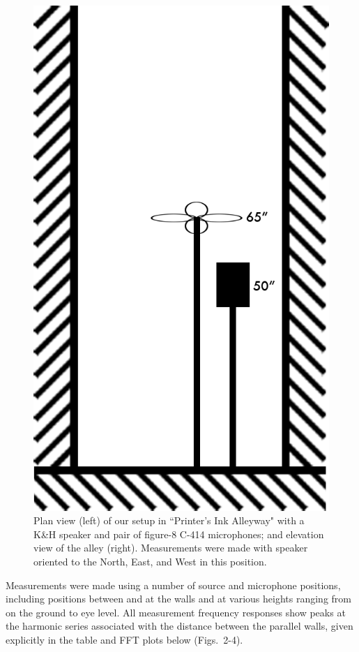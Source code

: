 \documentclass{aes137}
\begin{document}
\begin{figure}
\begin{minipage}[b]{0.41\linewidth}
\includegraphics[width=\textwidth]{images/alleyway_lookingdown.png}
\end{minipage}

\caption{Plan view (left) of our setup in ``Printer's Ink Alleyway"
  with a K\&H speaker and pair of figure-8 C-414 microphones; and
  elevation view of the alley (right). Measurements were made with
  speaker oriented to the North, East, and West in this position.}
\end{figure}

Measurements were made using a number of source and microphone
positions, including positions between and at the walls and at various
heights ranging from on the ground to eye level. All measurement
frequency responses show peaks at the harmonic series associated with
the distance between the parallel walls, given explicitly in the table
and FFT plots below (Figs.~2-4).
\end{document}
